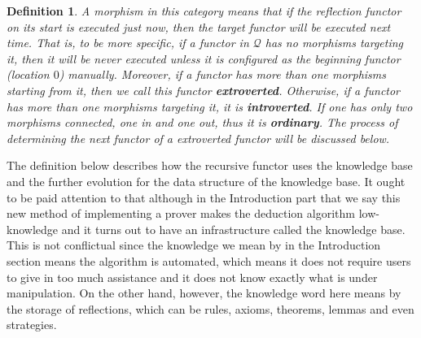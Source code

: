 \documentclass{aims}
\numberwithin{equation}{section}
\newtheorem{definition}{Definition}	%
\numberwithin{theorem}{section}	%
\numberwithin{axiom}{section}	%
\numberwithin{definition}{section}	%
\begin{document}
\begin{definition}
		A morphism in this category means that if the reflection functor on its start is executed just now, then the target functor will be executed next time. That is, to be more specific, if a functor in \(\mathcal{Q}\) has no morphisms targeting it, then it will be never executed unless it is configured as the beginning functor (location \(0\)) manually. Moreover, if a functor has more than one morphisms starting from it, then we call this functor \textbf{ extroverted}. Otherwise, if a functor has more than one morphisms targeting it, it is \textbf{ introverted}. If one has only two morphisms connected, one in and one out, thus it is\textbf{  ordinary}. The process of determining the next functor of a extroverted functor will be discussed below.
	\end{definition}
	
	The definition below describes how the recursive functor uses the knowledge base and the further evolution for the data structure of the knowledge base. It ought to be paid attention to that although in the Introduction part that we say this new method of implementing a prover makes the deduction algorithm low-knowledge and it turns out to have an infrastructure called the knowledge base. This is not conflictual since the knowledge we mean by in the Introduction section means the algorithm is automated, which means it does not require users to give in too much assistance and it does not know exactly what is under manipulation. On the other hand, however, the knowledge word here means by the storage of reflections, which can be rules, axioms, theorems, lemmas and even strategies.
	
\end{document}
